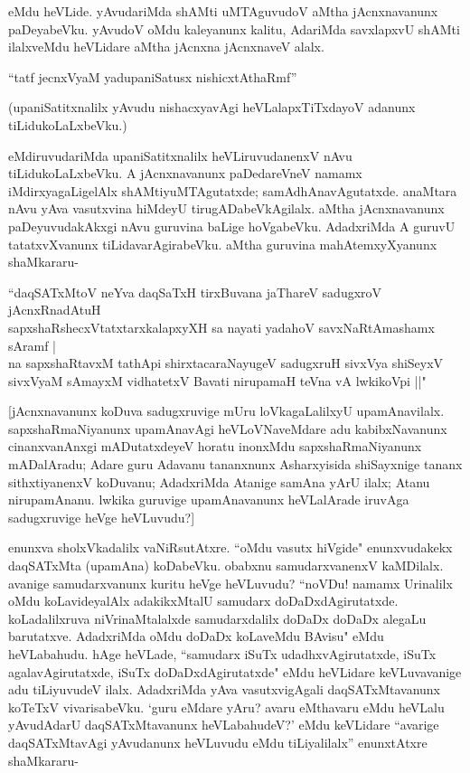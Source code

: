 eMdu heVLide. yAvudariMda shAMti uMTAguvudoV aMtha jAcnxnavanunx paDeyabeVku. yAvudoV oMdu kaleyanunx kalitu, AdariMda savxlapxvU shAMti ilalxveMdu heVLidare aMtha jAcnxna jAcnxnaveV alalx. 

\begin{shloka}
``tatf jecnxVyaM yadupaniSatusx nishicxtAthaRmf''
\end{shloka}

(upaniSatitxnalilx yAvudu nishacxyavAgi heVLalapxTiTxdayoV adanunx tiLidukoLaLxbeVku.)

eMdiruvudariMda upaniSatitxnalilx heVLiruvudanenxV nAvu tiLidukoLaLxbeVku. A jAcnxnavanunx paDedareVneV namamx iMdirxyagaLigelAlx shAMtiyuMTAgutatxde; samAdhAnavAgutatxde. anaMtara nAvu yAva vasutxvina hiMdeyU tirugADabeVkAgilalx. aMtha jAcnxnavanunx paDeyuvudakAkxgi nAvu guruvina baLige hoVgabeVku. AdadxriMda A guruvU tatatxvXvanunx tiLidavarAgirabeVku. aMtha guruvina mahAtemxyXyanunx shaMkararu-

\begin{shloka}
``daqSATxMtoV neYva daqSaTxH tirxBuvana jaThareV sadugxroV jAcnxRnadAtuH\\
sapxshaRshecxVtatxtarxkalapxyXH sa nayati yadahoV savxNaRtAmashamx sAramf |\\
na sapxshaRtavxM tathApi shirxtacaraNayugeV sadugxruH sivxVya shiSeyxV\\
sivxVyaM sAmayxM vidhatetxV Bavati nirupamaH teVna vA lwkikoV\s pi ||" 
\end{shloka}

[jAcnxnavanunx koDuva sadugxruvige mUru loVkagaLalilxyU upamAnavilalx. sapxshaRmaNiyanunx upamAnavAgi heVLoVNaveMdare adu kabibxNavanunx cinanxvanAnxgi mADutatxdeyeV horatu inonxMdu sapxshaRmaNiyanunx mADalAradu; Adare guru Adavanu tananxnunx Asharxyisida shiSayxnige tananx sithxtiyanenxV koDuvanu; AdadxriMda Atanige samAna yArU ilalx; Atanu nirupamAnanu. lwkika guruvige upamAnavanunx heVLalArade iruvAga sadugxruvige heVge heVLuvudu?]

enunxva sholxVkadalilx vaNiRsutAtxre. ``oMdu vasutx hiVgide" enunxvudakekx daqSATxMta (upamAna) koDabeVku. obabxnu samudarxvanenxV kaMDilalx. avanige samudarxvanunx kuritu heVge heVLuvudu? ``noVDu! namamx Urinalilx oMdu koLavideyalAlx adakikxMtalU samudarx doDaDxdAgirutatxde. koLadalilxruva niVrinaMtalalxde samudarxdalilx doDaDx doDaDx alegaLu barutatxve. AdadxriMda oMdu doDaDx koLaveMdu BAvisu" eMdu heVLabahudu. hAge heVLade, ``samudarx iSuTx udadhxvAgirutatxde, iSuTx agalavAgirutatxde, iSuTx doDaDxdAgirutatxde" eMdu heVLidare keVLuvavanige adu tiLiyuvudeV ilalx. AdadxriMda yAva vasutxvigAgali daqSATxMtavanunx koTeTxV vivarisabeVku. `guru eMdare yAru? avaru eMthavaru eMdu heVLalu yAvudAdarU daqSATxMtavanunx heVLabahudeV?' eMdu keVLidare ``avarige daqSATxMtavAgi yAvudanunx heVLuvudu eMdu tiLiyalilalx'' enunxtAtxre shaMkararu-

